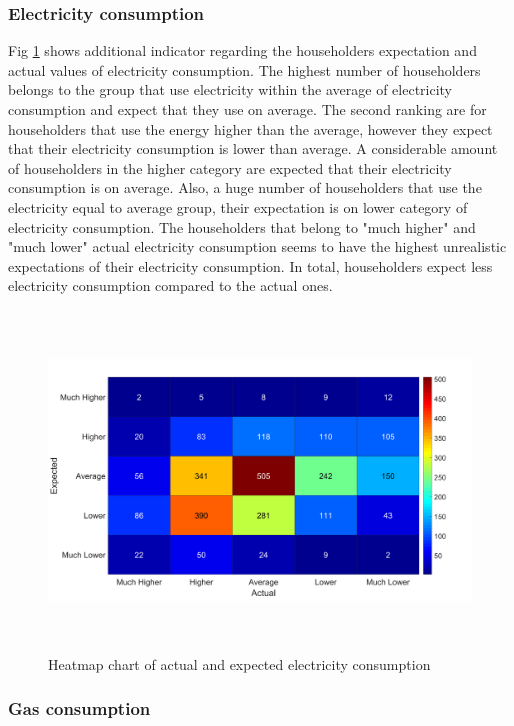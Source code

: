 \documentclass[preprint,12pt,3p]{elsarticle}
\begin{document}
\subsubsection{Electricity consumption}

Fig \ref{fig:9} shows additional indicator regarding the householders expectation and actual values of electricity consumption. The highest number of householders belongs to the group that use electricity within the average of electricity consumption and expect that they use on average. The second ranking are for householders that use the energy higher than the average, however they expect that their electricity consumption is lower than average. A considerable amount of householders in the higher category are expected that their electricity consumption is on average. Also, a huge number of householders that use the electricity equal to average group, their expectation is on lower category of electricity consumption. The householders that belong to "much higher" and "much lower" actual electricity consumption seems to have the highest unrealistic expectations of their electricity consumption. In total, householders expect less electricity consumption compared to the actual ones. 

\begin{figure}[H]
    \centering
    \includegraphics[width=15cm, height=9cm]{Electricity.png}
    \caption{Heatmap chart of actual and expected electricity consumption}
    \label{fig:9}
\end{figure}


\subsubsection{Gas consumption}
\end{document}
